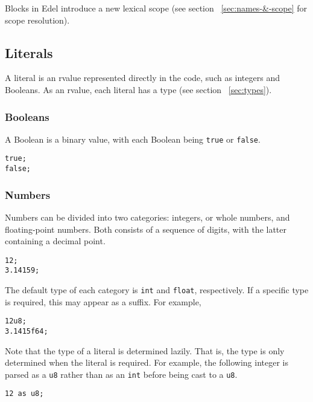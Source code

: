 Blocks in Edel introduce a new lexical scope (see section ~\ref{sec:names-&-scope} for scope resolution).

\subsection{Literals}

A literal is an rvalue represented directly in the code, such as integers and Booleans.
As an rvalue, each literal has a type (see section ~\ref{sec:types}).

\subsubsection{Booleans}

A Boolean is a binary value, with each Boolean being \texttt{true} or \texttt{false}.

\begin{lstlisting}[language=CustomLang]
true;
false;
\end{lstlisting}

\subsubsection{Numbers}

Numbers can be divided into two categories: integers, or whole numbers, and floating-point numbers.
Both consists of a sequence of digits, with the latter containing a decimal point.

\begin{lstlisting}[language=CustomLang]
12;
3.14159;
\end{lstlisting}

The default type of each category is \texttt{int} and \texttt{float}, respectively.
If a specific type is required, this may appear as a suffix.
For example,

\begin{lstlisting}[language=CustomLang]
12u8;
3.1415f64;
\end{lstlisting}

Note that the type of a literal is determined lazily.
That is, the type is only determined when the literal is required.
For example, the following integer is parsed as a \texttt{u8} rather than as an \texttt{int} before being cast to a \texttt{u8}.

\begin{lstlisting}[language=CustomLang]
12 as u8;
\end{lstlisting}

